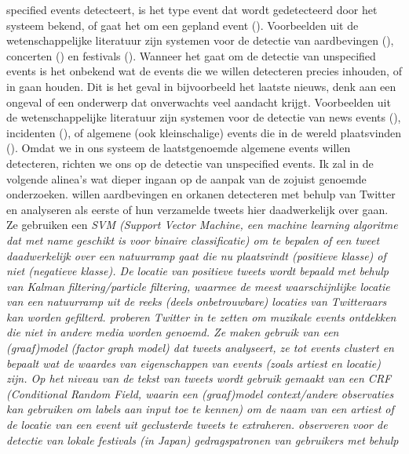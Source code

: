 {{specified events detecteert, is het type event dat wordt gedetecteerd door het 
systeem bekend, of gaat het om een gepland event (\citealt{atefeh2013survey}). Voorbeelden 
uit de wetenschappelijke literatuur zijn systemen voor de detectie van 
aardbevingen (\citealt{sakaki2010earthquake}), concerten (\citealt{benson2011event}) en festivals (\citealt{lee2010measuring}). 
Wanneer het gaat om de detectie van unspecified events is het onbekend wat 
de events die we willen detecteren precies inhouden, of in gaan houden. Dit is 
het geval in bijvoorbeeld het laatste nieuws, denk aan een ongeval 
of een onderwerp dat onverwachts veel aandacht krijgt. Voorbeelden uit de 
wetenschappelijke literatuur zijn systemen voor de detectie van news events
(\citealt{sankaranarayanan2009twitterstand}), incidenten (\citealt{abel2012twitcident}), of algemene (ook kleinschalige) events die in de wereld
plaatsvinden (\citealt{walther2013geo}). Omdat we in ons systeem de laatstgenoemde
algemene events willen detecteren, richten we ons op de detectie van unspecified
events. Ik zal in de volgende alinea's wat dieper ingaan op de aanpak van de zojuist genoemde onderzoeken.
\vl
\citet{sakaki2010earthquake} willen aardbevingen en orkanen detecteren met behulp van Twitter en analyseren 
als eerste of hun verzamelde tweets hier daadwerkelijk over gaan. Ze gebruiken een \it{SVM} (\it{Support Vector Machine}, een machine learning algoritme
dat met name geschikt is voor binaire classificatie) om te bepalen of een tweet daadwerkelijk over
een natuurramp gaat die nu plaatsvindt (positieve klasse) of niet (negatieve klasse). De locatie
van positieve tweets wordt bepaald met behulp van \it{Kalman filtering}/\it{particle filtering}, waarmee de meest
waarschijnlijke locatie van een natuurramp uit de reeks (deels onbetrouwbare) locaties van Twitteraars kan worden gefilterd.
\vl
\citet{benson2011event} proberen Twitter in te zetten om muzikale events ontdekken die niet in andere media worden genoemd.
Ze maken gebruik van een (graaf)model (\it{factor graph model}) dat tweets analyseert, ze tot events clustert en bepaalt wat de waardes van eigenschappen van events (zoals artiest en locatie) zijn. Op het niveau van de tekst van tweets
wordt gebruik gemaakt van een \it{CRF} (\it{Conditional Random Field}, waarin een (graaf)model context/andere observaties kan gebruiken om labels aan input toe te kennen)
om de naam van een artiest of de locatie van een event uit geclusterde tweets te extraheren.
\vl
\citet{lee2010measuring} observeren voor de detectie van lokale festivals (in Japan) gedragspatronen van gebruikers met behulp
}}
